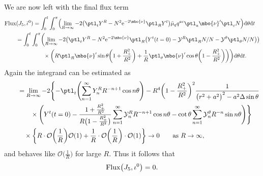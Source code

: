 We are now left with the final flux term
\begin{align*}
&{\rm Flux} (J_5, \bar{\iota}^0) = \int^t_0 \int^\pi_0 \Bigl(\lim_{R \to \infty} -2\bigl(\ptl_t Y^R - N^2 {\rm e}^{-2 \mbo{\nu}} \ptl_R Y^t\bigr) \bar{\mu}_q q^{ac} \ptl_a \mbo{\nu}' \ptl_c N \Bigr) {\rm d}\theta {\rm d}t \notag\\
&\qquad{} = \int^t_0 \int^\pi_0 \biggl(\lim_{R \to \infty} -2 \bigl(\ptl_t Y^R - N^2 {\rm e}^{-2 \mbo{\nu}} \ptl_R \bigl(Y^t (t=0) - \mathcal Y^R \ptl_R N/N -\mathcal{Y}^\theta \ptl_\theta N/N\bigr) \bigr) \notag\\
& \qquad\hphantom{= \int^t_0 \int^\pi_0 \biggl(}{} \times\biggl(R \ptl_R \mbo{\nu}' \sin \theta \biggl(1+ \frac{R^2_+}{R^2}\biggr) + \frac{1}{R} \ptl_ \theta \mbo{\nu}' \cos \theta \biggl(1- \frac{R^2_+}{R^2}\biggr) \biggr) \biggr) {\rm d}\theta {\rm d}t.
\end{align*}
Again the integrand can be estimated as
\begin{align*}
\qquad&{}= \lim_{R \to \infty} -2 \Biggl\{- \ptl_t \Biggl(\sum^{\infty}_{n=1} Y^R_n R^{-n+1} \cos n \theta \Biggr) - R^4 \biggl(1- \frac{R^2_+}{R^2}\biggr)^2 \frac{1}{ \bigl(r^2 +a^2\bigr)^2 - a^2 \Delta \sin \theta} \notag\\
& \qquad{}
\times \Biggl(Y^t(t=0)- \frac{1+ \frac{R^2_+}{R^2}}{R \bigl(1- \frac{R_+^2}{R^2}\bigr)} \sum^{\infty}_{n=1} \mathcal{Y}^R_n R^{-n+1} \cos n \theta - \cot \theta \sum^\infty_{n=1} \mathcal{Y}^\theta_n R^{-n} \sin n\theta \Biggr) \Biggr\} \notag\\
& \quad{}\times \biggl\{ R \cdot \mathcal{O} \biggl(\frac{1}{R}\biggr) \mathcal{O}(1) + \frac{1}{R} \cdot \mathcal{O}\biggl(\frac{1}{R}\biggr) \cdot \mathcal{O}(1) \biggr\} \to 0 \qquad \text{as} \ R \to \infty,
\end{align*}
and behaves like $\mathcal{O}\bigl(\frac{1}{R}\bigr)$ for large $R$.
Thus it follows that
\begin{align*}
{\rm Flux}\bigl(J_5, \iota^0\bigr) = 0.
\end{align*}
